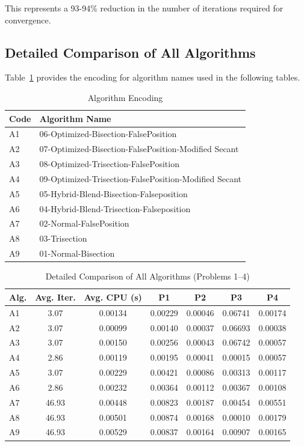 \documentclass[reprint, amsmath, amssymb, aps, prl]{revtex4-2}
\begin{document}
This represents a 93-94\% reduction in the number of iterations required for convergence.

\subsection{Detailed Comparison of All Algorithms}

Table~\ref{tab:alg_encoding} provides the encoding for algorithm names used in the following tables.

\begin{table}[H]
\centering
\caption{Algorithm Encoding}
\label{tab:alg_encoding}
\begin{tabular}{ll}
\toprule
Code & Algorithm Name \\
\midrule
A1 & 06-Optimized-Bisection-FalsePosition \\
A2 & 07-Optimized-Bisection-FalsePosition-Modified Secant \\
A3 & 08-Optimized-Trisection-FalsePosition \\
A4 & 09-Optimized-Trisection-FalsePosition-Modified Secant \\
A5 & 05-Hybrid-Blend-Bisection-Falseposition \\
A6 & 04-Hybrid-Blend-Trisection-Falseposition \\
A7 & 02-Normal-FalsePosition \\
A8 & 03-Trisection \\
A9 & 01-Normal-Bisection \\
\bottomrule
\end{tabular}
\end{table}

\begin{table}[H]
\centering
\caption{Detailed Comparison of All Algorithms (Problems 1--4)}
\label{tab:detailed_comparison_1}
\begin{tabular}{lcccccc}
\toprule
Alg. & Avg. Iter. & Avg. CPU (s) & P1 & P2 & P3 & P4 \\
\midrule
A1 & 3.07 & 0.00134 & 0.00229 & 0.00046 & 0.06741 & 0.00174 \\
A2 & 3.07 & 0.00099 & 0.00140 & 0.00037 & 0.06693 & 0.00038 \\
A3 & 3.07 & 0.00150 & 0.00256 & 0.00043 & 0.06742 & 0.00057 \\
A4 & 2.86 & 0.00119 & 0.00195 & 0.00041 & 0.00015 & 0.00057 \\
A5 & 3.07 & 0.00229 & 0.00421 & 0.00086 & 0.00313 & 0.00117 \\
A6 & 2.86 & 0.00232 & 0.00364 & 0.00112 & 0.00367 & 0.00108 \\
A7 & 46.93 & 0.00448 & 0.00823 & 0.00187 & 0.00454 & 0.00551 \\
A8 & 46.93 & 0.00501 & 0.00874 & 0.00168 & 0.00010 & 0.00179 \\
A9 & 46.93 & 0.00529 & 0.00837 & 0.00164 & 0.00907 & 0.00165 \\
\bottomrule
\end{tabular}
\end{table}
\end{document}
